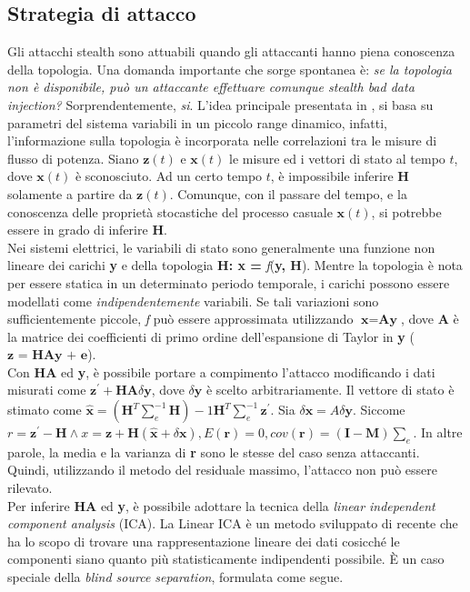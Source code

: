 \subsection{Strategia di attacco}
Gli attacchi stealth sono attuabili quando gli attaccanti hanno piena conoscenza della topologia. Una domanda importante che sorge spontanea è: \textit{se la topologia non è disponibile, può un attaccante effettuare comunque stealth bad data injection?} Sorprendentemente, \textit{si}. L'idea principale presentata in \cite{esmalifalak}, si basa su parametri del sistema variabili in un piccolo range dinamico, infatti, l'informazione sulla topologia è incorporata nelle correlazioni tra le misure di flusso di potenza. Siano $\textbf{z}(t)$ e $\textbf{x}(t)$ le misure ed i vettori di stato al tempo $t$, dove $\textbf{x}(t)$ è sconosciuto. Ad un certo tempo $t$, è impossibile inferire $\textbf{H}$ solamente a partire da $\textbf{z}(t)$. Comunque, con il passare del tempo, e la conoscenza delle proprietà stocastiche del processo casuale $\textbf{x}(t)$, si potrebbe essere in grado di inferire \textbf{H}.\\
Nei sistemi elettrici, le variabili di stato sono generalmente una funzione non lineare dei carichi \textbf{y} e della topologia \textbf{H: x = } \emph{f}(\textbf{y, H}). Mentre la topologia è nota per essere statica in un determinato periodo temporale, i carichi possono essere modellati come \textit{indipendentemente} variabili. Se tali variazioni sono sufficientemente piccole, \emph{f} può essere approssimata utilizzando $\textbf{x} = \textbf{Ay}$, dove \textbf{A} è la matrice dei coefficienti di primo ordine dell'espansione di Taylor in \textbf{y} ($\textbf{z = HAy + e}$).\\
Con \textbf{HA} ed \textbf{y}, è possibile portare a compimento l'attacco modificando i dati misurati come $\textbf{z}^\prime + \textbf{HA}\delta\textbf{y}$, dove $\delta\textbf{y}$ è scelto arbitrariamente.
Il vettore di stato è stimato come $\widehat{\textbf{x}} = (\textbf{H}^T\sum_e^{-1}\textbf{H})-1\textbf{H}^T\sum_e^{-1}\textbf{z}^\prime$. Sia $\delta\textbf{x} = A\delta\textbf{y}$. Siccome $r = \textbf{z}^\prime - \textbf{H}\wedge x = \textbf{z} + \textbf{H}(\widehat{\textbf{x}} + \delta\textbf{x}), E(\textbf{r}) = 0, cov(\textbf{r}) = (\textbf{I} - \textbf{M})\sum_e$. In altre parole, la media e la varianza di \textbf{r} sono le stesse del caso senza attaccanti. Quindi, utilizzando il metodo del residuale massimo, l'attacco non può essere rilevato.\\
Per inferire \textbf{HA} ed \textbf{y}, è possibile adottare la tecnica della \emph{linear independent component analysis} (ICA). La Linear ICA \cite{lica} è un metodo sviluppato di recente che ha lo scopo di trovare una rappresentazione lineare dei dati cosicché le componenti siano quanto più statisticamente indipendenti possibile. È un caso speciale della \emph{blind source separation}, formulata come segue.
